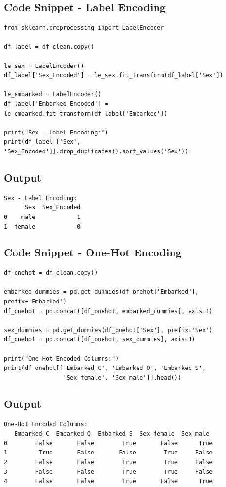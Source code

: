 \documentclass[12pt,a4paper]{article}
\begin{document}
\subsection{Code Snippet - Label Encoding}
\begin{lstlisting}
from sklearn.preprocessing import LabelEncoder

df_label = df_clean.copy()

le_sex = LabelEncoder()
df_label['Sex_Encoded'] = le_sex.fit_transform(df_label['Sex'])

le_embarked = LabelEncoder()
df_label['Embarked_Encoded'] = le_embarked.fit_transform(df_label['Embarked'])

print("Sex - Label Encoding:")
print(df_label[['Sex', 'Sex_Encoded']].drop_duplicates().sort_values('Sex'))
\end{lstlisting}

\subsection{Output}
\begin{verbatim}
Sex - Label Encoding:
      Sex  Sex_Encoded
0    male            1
1  female            0
\end{verbatim}

\subsection{Code Snippet - One-Hot Encoding}
\begin{lstlisting}
df_onehot = df_clean.copy()

embarked_dummies = pd.get_dummies(df_onehot['Embarked'], prefix='Embarked')
df_onehot = pd.concat([df_onehot, embarked_dummies], axis=1)

sex_dummies = pd.get_dummies(df_onehot['Sex'], prefix='Sex')
df_onehot = pd.concat([df_onehot, sex_dummies], axis=1)

print("One-Hot Encoded Columns:")
print(df_onehot[['Embarked_C', 'Embarked_Q', 'Embarked_S', 
                 'Sex_female', 'Sex_male']].head())
\end{lstlisting}

\subsection{Output}
\begin{verbatim}
One-Hot Encoded Columns:
   Embarked_C  Embarked_Q  Embarked_S  Sex_female  Sex_male
0        False       False        True       False      True
1         True       False       False        True     False
2        False       False        True        True     False
3        False       False        True        True     False
4        False       False        True       False      True
\end{verbatim}
\end{document}
